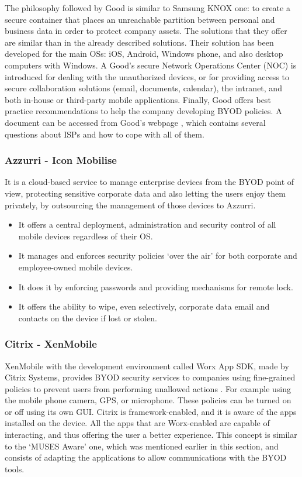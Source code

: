 The philosophy followed by Good \cite{Good_tool} is similar to Samsung KNOX one: to create a secure container that places an unreachable partition between personal and business data in order to protect company assets. The solutions that they offer \cite{Good_tool} are similar than in the already described solutions. Their solution has been developed for the main OSs: iOS, Android, Windows phone, and also desktop computers with Windows. A Good's secure Network Operations Center (NOC) is introduced for dealing with the unauthorized devices, or for providing access to secure collaboration solutions (email, documents, calendar), the intranet, and both in-house or third-party mobile applications. Finally, Good offers best practice recommendations to help the company developing BYOD policies. A document can be accessed from Good's webpage \cite{Good_tool}, which contains several questions about ISPs and how to cope with all of them.

\subsubsection{Azzurri - Icon Mobilise}

It is a cloud-based service \cite{Azzurri_tool} to manage enterprise devices from the BYOD point of view, protecting sensitive corporate data and also letting the users enjoy them privately, by outsourcing the management of those devices to Azzurri.
 
\begin{itemize}
\item It offers a central deployment, administration and security control of all mobile devices regardless of their OS.
\item It manages and enforces security policies `over the air' for both corporate and employee-owned mobile devices.
\item It does it by enforcing passwords and providing mechanisms for remote lock.
\item It offers the ability to wipe, even selectively, corporate data email and contacts on the device if lost or stolen.
\end{itemize}


\subsubsection{Citrix - XenMobile}

XenMobile with the development environment called Worx App SDK, made by Citrix Systems, provides BYOD security services to companies using fine-grained policies to prevent users from performing unallowed actions \cite{WorxSDK}. For example using the mobile phone camera, GPS, or microphone. These policies can be turned on or off using its own GUI. Citrix is framework-enabled, and it is aware of the apps installed on the device. All the apps that are Worx-enabled are capable of interacting, and thus offering the user a better experience. This concept is similar to the `MUSES Aware' one, which was mentioned earlier in this section, and consists of adapting the applications to allow communications with the BYOD tools.

